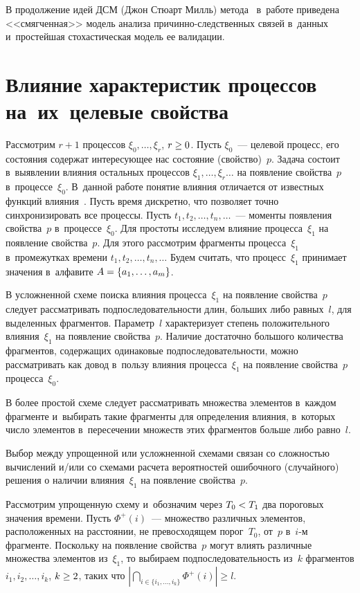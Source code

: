 \begin{multicols}{2}
  В продолжение идей ДСМ (Джон Стюарт Милль) ме\-то\-да~\cite{6-gru} в~работе приведена 
<<смягченная>> модель анализа при\-чин\-но-след\-ст\-вен\-ных связей в~данных 
и~простейшая стохастическая модель ее валидации. 
  
\section{Влияние характеристик процессов на~их~целевые свойства} 

  Рассмотрим $r+1$ процессов $\xi_0,\ldots, \xi_r$, $r\hm\geq 0$. Пусть 
$\xi_0$~--- целевой процесс, его состояния содержат интересующее нас 
состояние (свойство)~$p$. Задача состоит в~выявлении влияния остальных 
процес\-сов $\xi_1,\ldots, \xi_r\ldots$ на появление свойства~$p$ в~процессе~$\xi_0$. 
В~данной работе понятие влияния отличается от известных функций 
влияния~\cite{7-gru}. Пусть время дискретно, что позволяет точно 
синхронизировать все процессы. Пусть $t_1, t_2, \ldots , t_n, \ldots$~--- моменты 
появления свойства~$p$ в~процессе~$\xi_0$. Для простоты исследуем влияние 
процесса~$\xi_1$ на появление свойства~$p$. Для этого рассмотрим фрагменты 
процесса~$\xi_1$ в~промежутках времени $t_1, t_2,\ldots , t_n, \ldots$ Будем 
считать, что процесс~$\xi_1$ принимает значения в~алфавите  $A\hm= \{a_1, 
\ldots ,a_m\}$. 
  
  В усложненной схеме поиска влияния процесса~$\xi_1$ на появление 
свойства~$p$ следует рассматривать подпоследовательности длин, б$\acute{\mbox{о}}$льших 
либо равных~$l$, для выделенных фрагментов. Параметр~$l$ характеризует 
степень положительного влияния~$\xi_1$ на появление свойства~$p$. Наличие 
достаточно большого количества фрагментов, содержащих одинаковые 
подпоследовательности, можно рассматривать как довод в~пользу влияния 
процесса~$\xi_1$ на появление свойства~$p$ процесса~$\xi_0$. 
  
  В более простой схеме следует рассматривать множества элементов 
в~каждом фрагменте и~выбирать такие фрагменты для определения влияния, 
в~которых число элементов в~пересечении множеств этих фрагментов больше 
либо рав\-но~$l$. 
  
  Выбор между упрощенной или усложненной схемами связан со сложностью 
вычислений и/или со схемами расчета вероятностей ошибочного (случайного) 
решения о наличии влияния~$\xi_1$ на появление свойства~$p$. 
  
  Рассмотрим упрощенную схему и~обозначим через $T_0\hm<T_1$ два 
пороговых значения времени. Пусть $\Phi^+(i)$~--- множество различных 
элементов, расположенных на расстоянии, не превосходящем порог~$T_0$, 
от~$p$ в~$i$-м фрагменте. Поскольку на появление свойства~$p$ могут влиять 
различные множества элементов из~$\xi_1$, то выбираем 
подпоследовательность из~$k$ фрагментов $i_1, i_2, \ldots , i_k$, $k\hm\geq 2$, 
таких что
  $
  \left\vert \mathop{\bigcap}\limits_{i\in \{i_1, \ldots ,i_k\}}
  \Phi^+(i)\right\vert \geq l.$ 
  

\end{multicols}

